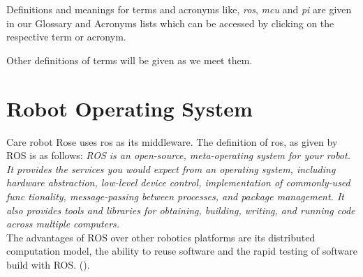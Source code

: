 \documentclass[12pt]{scrreprt}
\begin{document}
\\\\
Definitions and meanings for terms and acronyms like, \textit{\acrshort{ros}}, \textit{\acrshort{mcu}} and \textit{\acrshort{pi}} are given in our Glossary and Acronyms lists which can be accessed by clicking on the respective term or acronym.
\par
Other definitions of terms will be given as we meet them.
    

\section{Robot Operating System}
\label{tROS}
Care robot Rose uses \acrfull{ros} as its middleware. The definition of \acrfull{ros}, as given by ROS \cite{ros_wiki_introducton} is as follows:
\textit{ROS is an open-source, meta-operating system for your robot. It provides the services you would expect from an operating system, including hardware abstraction, low-level device control, implementation of commonly-used func tionality, message-passing between processes, and package management. It also provides tools and libraries for obtaining, building, writing, and running code across multiple computers.}\\
 The advantages of ROS over other robotics platforms are its distributed computation model, the ability to reuse software and the rapid testing of software build with ROS. (\cite{agitr}).
 
\end{document}
